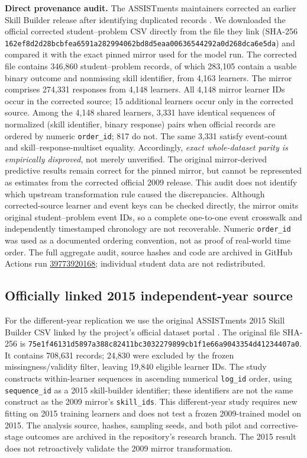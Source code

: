 \documentclass[11pt,a4paper]{article}
\begin{document}
\textbf{Direct provenance audit.} The ASSISTments maintainers corrected an earlier Skill Builder release after identifying duplicated records \citep{assistmentsdata}. We downloaded the official corrected student--problem CSV directly from the file they link (SHA-256 \texttt{162ef8d2d28bcbfea6591a282994062bd8d5eaa00636544292a0d268dca6e5da}) and compared it with the exact pinned mirror used for the model run. The corrected file contains 346,860 student--problem records, of which 283,105 contain a usable binary outcome and nonmissing skill identifier, from 4,163 learners. The mirror comprises 274,331 responses from 4,148 learners. All 4,148 mirror learner IDs occur in the corrected source; 15 additional learners occur only in the corrected source. Among the 4,148 shared learners, 3,331 have identical sequences of normalized (skill identifier, binary response) pairs when official records are ordered by numeric \texttt{order\_id}; 817 do not. The same 3,331 satisfy event-count and skill--response-multiset equality. Accordingly, \emph{exact whole-dataset parity is empirically disproved}, not merely unverified. The original mirror-derived predictive results remain correct for the pinned mirror, but cannot be represented as estimates from the corrected official 2009 release. This audit does not identify which upstream transformation rule caused the discrepancies. Although corrected-source learner and event keys can be checked directly, the mirror omits original student--problem event IDs, so a complete one-to-one event crosswalk and independently timestamped chronology are not recoverable. Numeric \texttt{order\_id} was used as a documented ordering convention, not as proof of real-world time order. The full aggregate audit, source hashes and code are archived in GitHub Actions run \href{https://github.com/devissaputra/knowledge_tracing_benchmark/actions/runs/39773920168}{39773920168}; individual student data are not redistributed.

\subsection{Officially linked 2015 independent-year source}
For the different-year replication we use the original ASSISTments 2015 Skill Builder CSV linked by the project's official dataset portal \citep{assistments2015}. The original file SHA-256 is \texttt{75e1f46131d5897a388c82411bc303}\texttt{2279899cb1f1e66a9043354d41234407a0}. It contains 708,631 records; 24,830 were excluded by the frozen missingness/validity filter, leaving 19,840 eligible learner IDs. The study constructs within-learner sequences in ascending numerical \texttt{log\_id} order, using \texttt{sequence\_id} as a 2015 skill-builder identifier; these identifiers are not the same construct as the 2009 mirror's \texttt{skill\_ids}. This different-year study requires new fitting on 2015 training learners and does not test a frozen 2009-trained model on 2015. The analysis source, hashes, sampling seeds, and both pilot and corrective-stage outcomes are archived in the repository's research branch. The 2015 result does not retroactively validate the 2009 mirror transformation.
\end{document}
